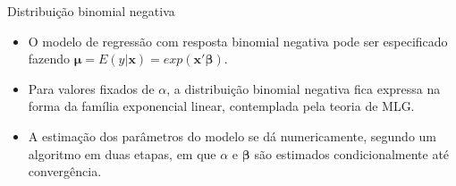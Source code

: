 \documentclass[10pt, aspectratio=169]{beamer}
\begin{document}








\begin{frame}{Distribuição binomial negativa} 

\begin{itemize}

\item O modelo de regressão com resposta binomial negativa pode ser especificado fazendo $\boldsymbol{\mu}=E(y|\boldsymbol{x})=exp(\boldsymbol{x'\beta}).$

\vspace{0.5cm}

\item Para valores fixados de $\alpha$, a distribuição binomial negativa fica expressa na forma da família exponencial linear, contemplada pela teoria de MLG.

\vspace{0.5cm}

\item A estimação dos parâmetros do modelo se dá numericamente, segundo um algoritmo em duas etapas, em que $\alpha$ e $\boldsymbol{\beta}$ são estimados condicionalmente até convergência.

\end{itemize}

\end{frame}
\end{document}
